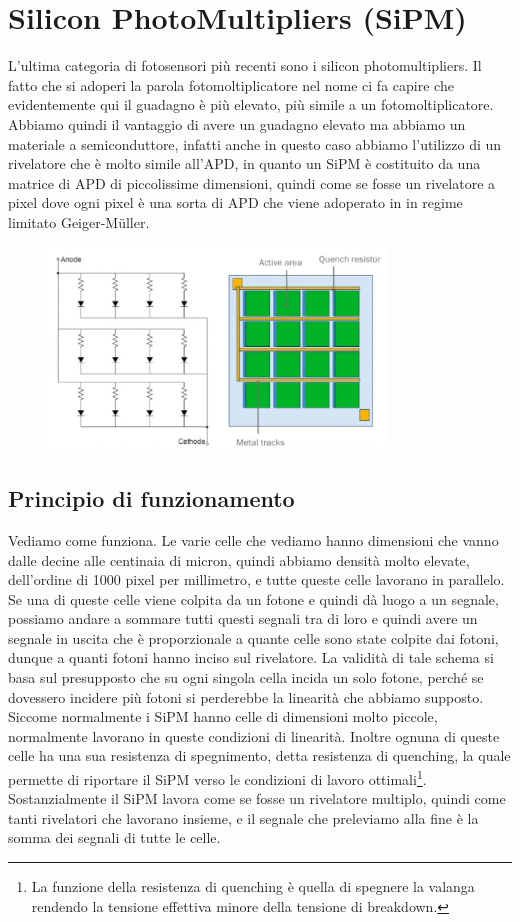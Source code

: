 \section{Silicon PhotoMultipliers (SiPM)}
L'ultima categoria di fotosensori più recenti sono i silicon photomultipliers. Il fatto che si adoperi la parola fotomoltiplicatore nel nome ci fa capire che evidentemente qui il guadagno è più elevato, più simile a un fotomoltiplicatore. Abbiamo quindi il vantaggio di avere un guadagno elevato ma abbiamo un materiale a semiconduttore, infatti anche in questo caso abbiamo l'utilizzo di un rivelatore che è molto simile all'APD, in quanto un SiPM è costituito da una matrice di APD di piccolissime dimensioni, quindi come se fosse un rivelatore a pixel dove ogni pixel è una sorta di APD che viene adoperato in in regime limitato Geiger-Müller.
\begin{figure}[H]
   \centering
   \includegraphics[width=0.8\textwidth]{immagini/SiPM.png}
\end{figure}
\subsection{Principio di funzionamento}
Vediamo come funziona. Le varie celle che vediamo hanno dimensioni che vanno dalle decine alle centinaia di micron, quindi abbiamo densità molto elevate, dell'ordine di 1000 pixel per millimetro, e tutte queste celle lavorano in parallelo. Se una di queste celle viene colpita da un fotone e quindi dà luogo a un segnale, possiamo andare a sommare tutti questi segnali tra di loro e quindi avere un segnale in uscita che è proporzionale a quante celle sono state colpite dai fotoni, dunque a quanti fotoni hanno inciso sul rivelatore. La validità di tale schema si basa sul presupposto che su ogni singola cella incida un solo fotone, perché se dovessero incidere più fotoni si perderebbe la linearità che abbiamo supposto. Siccome normalmente i SiPM hanno celle di dimensioni molto piccole, normalmente lavorano in queste condizioni di linearità. Inoltre ognuna di queste celle ha una sua resistenza di spegnimento, detta resistenza di quenching, la quale permette di riportare il SiPM verso le condizioni di lavoro ottimali\footnote{La funzione della resistenza di quenching è quella di spegnere la valanga rendendo la tensione effettiva minore della tensione di breakdown.}. Sostanzialmente il SiPM lavora come se fosse un rivelatore multiplo, quindi come tanti rivelatori che lavorano insieme, e il segnale che preleviamo alla fine è la somma dei segnali di tutte le celle.

